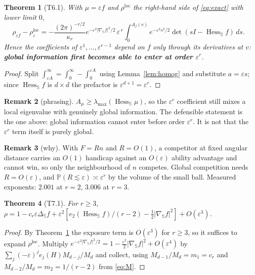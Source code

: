 \documentclass[11pt]{article}
\newtheorem{theorem}{Theorem}[section]
\theoremstyle{definition}
\newtheorem{remark}[theorem]{Remark}
\DeclareMathOperator{\Hess}{Hess}
\newcommand{\Prob}{\mathbb{P}}
\newcommand{\Sph}{\mathbb{S}}
\newcommand{\Lap}{\Delta_{\Sph}}
\newcommand{\gradS}{\nabla_{\Sph}}
\begin{document}
\begin{theorem}[\textsf{T6.1}]\label{thm:epsr}
With $\mu=\varepsilon f$ and $\rho^{\mathrm{loc}}$ the right-hand side of
\eqref{eq:exact} with lower limit $0$,
\[
  \rho_{\varepsilon f}-\rho^{\mathrm{loc}}_{\varepsilon}
  =-\frac{(2\pi)^{-r/2}}{\kappa_{r}}
  e^{-\varepsilon^{2}\lvert\gradS f\rvert^{2}/2}\,
  \varepsilon^{\,r}\!\int_{0}^{A_{f}(v)}\!e^{-\varepsilon^{2}s^{2}/2}
  \det(sI-\Hess_{\Sph}f)\,ds .
\]
Hence the coefficients of $\varepsilon^{1},\dots,\varepsilon^{r-1}$ depend on
$f$ only through its derivatives at $v$: \textbf{global information first
becomes able to enter at order $\varepsilon^{r}$}.
\end{theorem}
\begin{proof}
Split $\int_{\varepsilon A}^{\infty}=\int_{0}^{\infty}-\int_{0}^{\varepsilon A}$
using Lemma~\ref{lem:homog} and substitute $a=\varepsilon s$; since
$\Hess_{\Sph}f$ is $d\times d$ the prefactor is $\varepsilon^{d+1}=\varepsilon^{r}$.
\end{proof}

\begin{remark}[phrasing]
$A_{\mu}\ge\lambda_{\max}(\Hess_{\Sph}\mu)$, so the $\varepsilon^{r}$
coefficient still mixes a local eigenvalue with genuinely global information.
The defensible statement is the one above: global information cannot enter
before order $\varepsilon^{r}$. It is not that the $\varepsilon^{r}$ term
itself is purely global.
\end{remark}

\begin{remark}[why]
With $F=Rn$ and $R=O(1)$, a competitor at fixed angular distance carries an
$O(1)$ handicap against an $O(\varepsilon)$ ability advantage and cannot win,
so only the neighbourhood of $n$ competes. Global competition needs
$R=O(\varepsilon)$, and $\Prob(R\lesssim\varepsilon)\asymp\varepsilon^{r}$ by
the volume of the small ball. Measured exponents: $2.001$ at $r=2$, $3.006$ at
$r=3$.
\end{remark}

\begin{theorem}[\textsf{T7.1}]\label{thm:second}
For $r\ge3$,
$\rho=1-c_{r}\varepsilon\Lap f
+\varepsilon^{2}[e_{2}(\Hess_{\Sph}f)/(r-2)-\tfrac12\lvert\gradS f\rvert^{2}]
+O(\varepsilon^{3})$.
\end{theorem}
\begin{proof}
By Theorem~\ref{thm:epsr} the exposure term is $O(\varepsilon^{3})$ for
$r\ge3$, so it suffices to expand $\rho^{\mathrm{loc}}$. Multiply
$e^{-\varepsilon^{2}\lvert\gradS f\rvert^{2}/2}
=1-\tfrac{\varepsilon^{2}}2\lvert\gradS f\rvert^{2}+O(\varepsilon^{4})$ by
$\sum_{j}(-\varepsilon)^{j}e_{j}(H)M_{d-j}/M_{d}$ and collect, using
$M_{d-1}/M_{d}=m_{1}=c_{r}$ and $M_{d-2}/M_{d}=m_{2}=1/(r-2)$ from
\eqref{eq:M}.
\end{proof}
\end{document}
